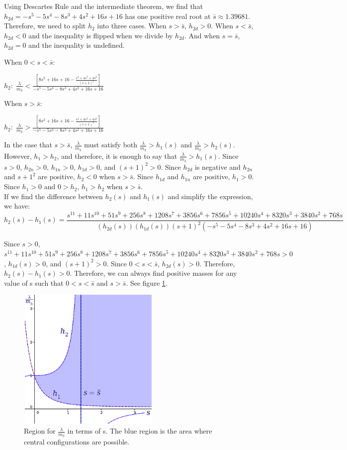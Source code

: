 \documentclass[11pt,leqno]{article}
\theoremstyle{definition}
\theoremstyle{remark}
\numberwithin{equation}{section}
\begin{document}
Using Descartes Rule and the intermediate theorem, we find that $h_{2d}=-s^{5}-5s^{4}-8s^{3}+4s^{2}+16s+16$ has one positive real root at $\bar{s}\approx1.39681$. Therefore, we need to split $h_2$ into three cases.  When $s>\bar{s}$, $h_{2d}>0$. When $s<\bar{s}$, $h_{2d}<0$ and the inequality is flipped when we divide by $h_{2d}$. And when $s=\bar{s}$, $h_{2d}=0$ and the inequality is undefined.

When $0<s<\bar{s}$:

$h_{2}:\;\frac{\lambda}{m_{3}}<\frac{[8s^{2}+16s+16-\frac{s^{4}+4s^{3}+4s^{2}}{(s+1)^{2}}]}{-s^{5}-5s^{4}-8s^{3}+4s^{2}+16s+16}$

When $s>\bar{s}$:

$h_{2}:\;\frac{\lambda}{m_{3}}>\frac{[8s^{2}+16s+16-\frac{s^{4}+4s^{3}+4s^{2}}{(s+1)^{2}}]}{-s^{5}-5s^{4}-8s^{3}+4s^{2}+16s+16}$

In the case that $s>\bar{s}$, $\frac{\lambda}{m_3}$ must satisfy both $\frac{\lambda}{m_{3}}>h_{1}(s)$ and $\frac{\lambda}{m_{3}}>h_{2}(s)$. However, $h_{1} > h_2$, and therefore, it is enough to say that $\frac{\lambda}{m_{3}}>h_{1}(s)$. Since $s>0$, $h_{2n} > 0$, $h_{1n} >0$, $h_{1d}>0$, and $(s+1)^2>0$. Since $h_{2d}$ is negative and $h_{2n}$ and ${s+1}^2$ are positive, $h_{2}<0$ when $s>\bar{s}$. Since $h_{1d}$ and $h_{1n}$ are positive, $h_1>0$. Since $h_1>0$ and $0>h_2$, $h_1>h_2$ when $s>\bar{s}$. \\

If we find the difference between $h_{2}(s)$ and $h_{1}(s)$ and simplify the expression, we
have: $$h_{2}(s)-h_{1}(s)=\frac{s^{11}+11s^{10}+51s^{9}+256s^{8}+1208s^{7}+3856s^{6}+7856s^{5}+10240s^{4}+8320s^{3}+3840s^{2}+768s}{(h_{2d}(s))(h_{1d}(s))(s+1)^{2}(-s^{5}-5s^{4}-8s^{3}+4s^{2}+16s+16)}$$

Since $s>0$, $s^{11}+11s^{10}+51s^{9}+256s^{8}+1208s^{7}+3856s^{6}+7856s^{5}+10240s^{4}+8320s^{3}+3840s^{2}+768s>0$,
$h_{1d}(s)>0$, and $(s+1)^{2}>0$. Since $0<s<\bar{s}$, $h_{2d}(s)>0$.
Therefore, $h_{2}(s)-h_{1}(s)>0.$ Therefore, we can always find positive
masses for any value of s such that $0<s<\bar{s}$ and $s>\bar{s}$. See figure \ref{SCG1}.

\begin{center}
\begin{figure}
\label{SCG1}
\includegraphics[width=2.7in, height=2.7in]{Lm3RegionSpecialCase.png}
 \caption{Region for $\frac{\lambda}{m_3}$ in terms of s. The blue region is the area where central configurations are possible.  }
\end{figure}
\end{center}
\end{document}
